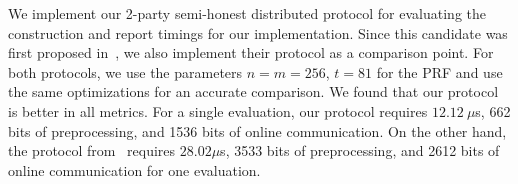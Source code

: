 \begin{table}[!t]
	{
		\centering
		\caption{Centralized 23-wPRF benchmarks for a baseline implementation and for different optimization techniques. Packing was done into 64-bit sized words (for both $\Z_2$ and $\Z_3$ vectors). For the lookup table optimization, a table with $81 \times 2^{20}$ $\Z_3$ elements, or roughly of size $135$MB, was preprocessed. Runtimes are all given in microseconds ($\mu$s).
		}
		\label{table:optimization_benchmarks}
	}
\end{table}


We implement our 2-party semi-honest distributed protocol for evaluating the \ttwPRF construction and report timings for our implementation. Since this candidate was first proposed in~\cite{boneh2018-darkmatter}, we also implement their protocol as a comparison point. For both protocols, we use the parameters $n=m=256$, $t=81$ for the PRF and use the same optimizations for an accurate comparison. We found that our protocol is better in all metrics. For a single evaluation, our protocol requires $12.12~\mu$s, 662 bits of preprocessing, and 1536 bits of online communication. On the other hand, the protocol from~\cite{boneh2018-darkmatter} requires $28.02\mu$s, 3533 bits of preprocessing, and 2612 bits of online communication for one evaluation.

